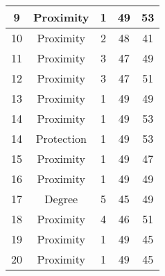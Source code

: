 \documentclass[results.tex]{subfiles}
\begin{document}
\begin{center}
\begin{tabular}{| c || c | c | c | c |}
            \hline
            9                       & Proximity                    & 1                      & 49                      & 53                   \\
            \hline
            10                      & Proximity                    & 2                      & 48                      & 41                   \\
            \hline
            11                      & Proximity                    & 3                      & 47                      & 49                   \\
            \hline
            12                      & Proximity                    & 3                      & 47                      & 51                   \\
            \hline
            13                      & Proximity                    & 1                      & 49                      & 49                   \\
            \hline
            14                      & Proximity                    & 1                      & 49                      & 53                   \\
            \hline
            14                      & Protection                   & 1                      & 49                      & 53                   \\
            \hline
            15                      & Proximity                    & 1                      & 49                      & 47                   \\
            \hline
            16                      & Proximity                    & 1                      & 49                      & 49                   \\
            \hline
            17                      & Degree                       & 5                      & 45                      & 49                   \\
            \hline
            18                      & Proximity                    & 4                      & 46                      & 51                   \\
            \hline
            19                      & Proximity                    & 1                      & 49                      & 45                   \\
            \hline
            20                      & Proximity                    & 1                      & 49                      & 45                   \\

\end{tabular}
\end{center}
\end{document}
